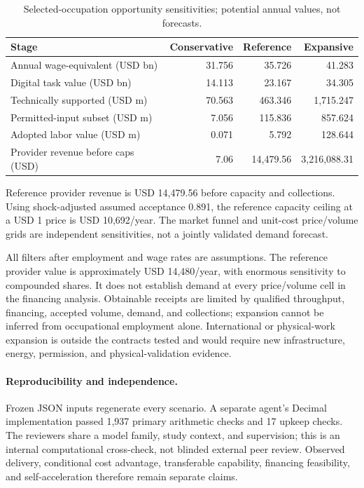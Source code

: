 \begin{table}[tbp]
\centering\small
\caption{Selected-occupation opportunity sensitivities; potential annual values, not forecasts.}
\label{tab:ec-market-results}
\begin{tabular}{lrrr}
\toprule
Stage & Conservative & Reference & Expansive \\
\midrule
Annual wage-equivalent (USD bn) & 31.756 & 35.726 & 41.283 \\
Digital task value (USD bn) & 14.113 & 23.167 & 34.305 \\
Technically supported (USD m) & 70.563 & 463.346 & 1,715.247 \\
Permitted-input subset (USD m) & 7.056 & 115.836 & 857.624 \\
Adopted labor value (USD m) & 0.071 & 5.792 & 128.644 \\
Provider revenue before caps (USD) & 7.06 & 14,479.56 & 3,216,088.31 \\
\bottomrule
\end{tabular}
\par\smallskip\begin{minipage}{0.97\linewidth}\footnotesize Reference provider revenue is USD 14,479.56 before capacity and collections. Using shock-adjusted assumed acceptance 0.891, the reference capacity ceiling at a USD 1 price is USD 10,692/year. The market funnel and unit-cost price/volume grids are independent sensitivities, not a jointly validated demand forecast.
\end{minipage}
\end{table}


All filters after employment and wage rates are assumptions. The reference
provider value is approximately USD 14,480/year, with enormous sensitivity to
compounded shares. It does not establish demand at every price/volume cell
in the financing analysis. Obtainable receipts are limited by qualified
throughput, financing, accepted volume, demand, and collections; expansion
cannot be inferred from occupational employment alone. International or
physical-work expansion is outside the contracts tested and would require
new infrastructure, energy, permission, and physical-validation evidence.

\paragraph{Reproducibility and independence.}
Frozen JSON inputs regenerate every scenario. A separate agent's Decimal
implementation passed 1,937 primary arithmetic checks and 17 upkeep checks.
The reviewers share a model family, study context, and supervision; this is
an internal computational cross-check, not blinded external peer review.
Observed delivery, conditional cost advantage, transferable capability,
financing feasibility, and self-acceleration therefore remain separate claims.

